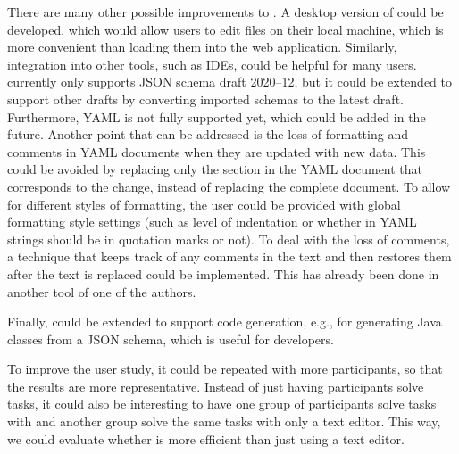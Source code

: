 There are many other possible improvements to \toolname{}.
A desktop version of \toolname{} could be developed, which would allow users to
edit files on their local machine, which is more convenient than loading them into the web application.
Similarly, integration into other tools, such as IDEs, could be helpful for many users.
\toolname{} currently only supports JSON schema draft 2020--12, but it could be extended to support
other drafts by converting imported schemas to the latest draft.
Furthermore, YAML is not fully supported yet, which could be added in the future.
Another point that can be addressed is the loss of formatting and comments in YAML documents when they are updated with new data.
This could be avoided by replacing only the section in the YAML document that corresponds to the change, instead of replacing the complete document.
To allow for different styles of formatting, the user could be provided with global formatting style settings (such as level of indentation or whether in YAML strings should be in quotation marks or not).
To deal with the loss of comments, a technique that keeps track of any comments in the text and then restores them after the text is replaced could be implemented. This has already been done in another tool of one of the authors\cite{githubBspEditor}.

Finally, \toolname{} could be extended to support code generation, e.g., for generating
Java classes from a JSON schema, which is useful for developers.

To improve the user study, it could be repeated with more participants,
so that the results are more representative.
Instead of just having participants solve tasks, it could also be interesting to
have one group of participants solve tasks with \toolname{} and another group solve
the same tasks with only a text editor.
This way, we could evaluate whether \toolname{} is more efficient than
just using a text editor.

